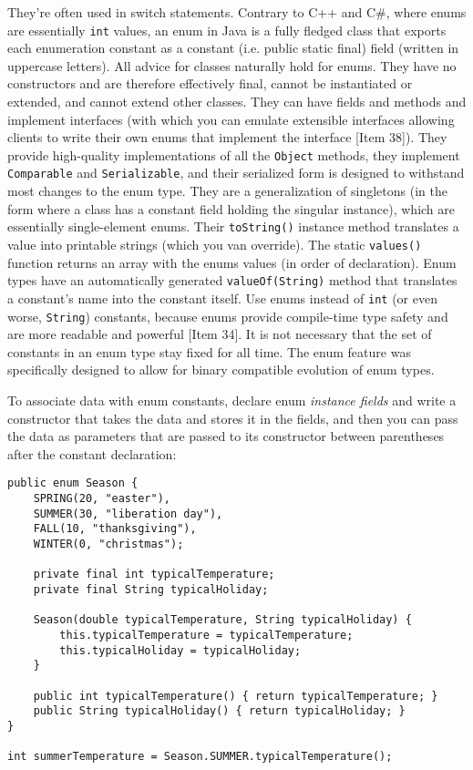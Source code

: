 \documentclass[8pt, table, xcdraw]{article}%
\begin{document}
They're often used in switch statements. Contrary to C++ and C\#, where enums are essentially \lstinline{int} values, an enum in Java is a fully fledged class that exports each enumeration constant as a constant (i.e. public static final) field (written in uppercase letters). All advice for classes naturally hold for enums. They have no constructors and are therefore effectively final, cannot be instantiated or extended, and cannot extend other classes. They can have fields and methods and implement interfaces (with which you can emulate extensible interfaces allowing clients to write their own enums that implement the interface [Item 38]). They provide high-quality implementations of all the \lstinline{Object} methods, they implement \lstinline{Comparable} and \lstinline{Serializable}, and their serialized form is designed to withstand most changes to the enum type. They are a generalization of singletons (in the form where a class has a constant field holding the singular instance), which are essentially single-element enums. Their \lstinline{toString()} instance method translates a value into printable strings (which you van override). The static \lstinline{values()} function returns an array with the enums values (in order of declaration). Enum types have an automatically generated \lstinline{valueOf(String)} method that translates a constant's name into the constant itself. Use enums instead of \lstinline{int} (or even worse, \lstinline{String}) constants, because enums provide compile-time type safety and are more readable and powerful [Item 34]. It is not necessary that the set of constants in an enum type stay fixed for all time. The enum feature was specifically designed to allow for binary compatible evolution of enum types.

To associate data with enum constants, declare enum \emph{instance fields} and write a constructor that takes the data and stores it in the fields, and then you can pass the data as parameters that are passed to its constructor between parentheses after the constant declaration:

\begin{lstlisting}
public enum Season {
    SPRING(20, "easter"),
    SUMMER(30, "liberation day"),
    FALL(10, "thanksgiving"),
    WINTER(0, "christmas");

    private final int typicalTemperature;
    private final String typicalHoliday;

    Season(double typicalTemperature, String typicalHoliday) {
        this.typicalTemperature = typicalTemperature;
        this.typicalHoliday = typicalHoliday;
    }
    
    public int typicalTemperature() { return typicalTemperature; }
    public String typicalHoliday() { return typicalHoliday; }
}

int summerTemperature = Season.SUMMER.typicalTemperature();
\end{lstlisting}
\end{document}
